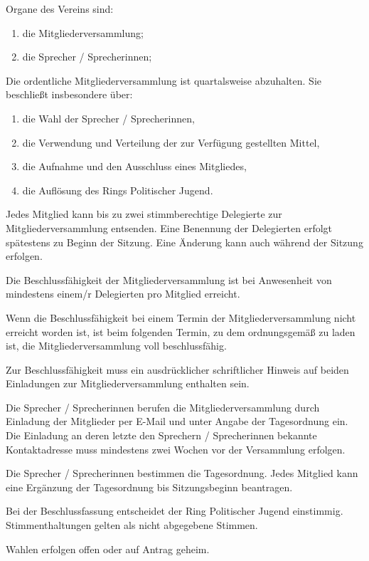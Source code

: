 \documentclass[10pt,a4paper,oneside,parskip=half]{scrartcl}
\begin{document}
\begin{contract}
Organe des Vereins sind:
\begin{enumerate}
\item die Mitgliederversammlung;
\item die Sprecher / Sprecherinnen;
\end{enumerate}

Die ordentliche Mitgliederversammlung ist quartalsweise abzuhalten. Sie beschließt insbesondere über:
\begin{enumerate}
\item die Wahl der Sprecher / Sprecherinnen,
\item die Verwendung und Verteilung der zur Verfügung gestellten Mittel,
\item die Aufnahme und den Ausschluss eines Mitgliedes,
\item die Auflösung des Rings Politischer Jugend.
\end{enumerate}

Jedes Mitglied kann bis zu zwei stimmberechtige Delegierte zur Mitgliederversammlung entsenden. Eine Benennung der Delegierten erfolgt spätestens zu Beginn der Sitzung. Eine Änderung kann auch während der Sitzung erfolgen.

Die Beschlussfähigkeit der Mitgliederversammlung ist bei Anwesenheit von mindestens einem/r Delegierten pro Mitglied erreicht.

Wenn die Beschlussfähigkeit bei einem Termin der Mitgliederversammlung nicht erreicht worden ist, ist beim folgenden Termin, zu dem ordnungsgemäß zu laden ist, die Mitgliederversammlung voll beschlussfähig.

Zur Beschlussfähigkeit muss ein ausdrücklicher schriftlicher Hinweis auf beiden Einladungen zur Mitgliederversammlung enthalten sein.

Die Sprecher / Sprecherinnen berufen die Mitgliederversammlung durch Einladung der Mitglieder per E-Mail und unter Angabe der Tagesordnung ein. Die Einladung an deren letzte den Sprechern / Sprecherinnen bekannte Kontaktadresse muss mindestens zwei Wochen vor der Versammlung erfolgen.

Die Sprecher / Sprecherinnen bestimmen die Tagesordnung. Jedes Mitglied kann eine Ergänzung der Tagesordnung bis Sitzungsbeginn beantragen.

Bei der Beschlussfassung entscheidet der Ring Politischer Jugend einstimmig. Stimmenthaltungen gelten als nicht abgegebene Stimmen.

Wahlen erfolgen offen oder auf Antrag geheim.


\end{contract}
\end{document}
